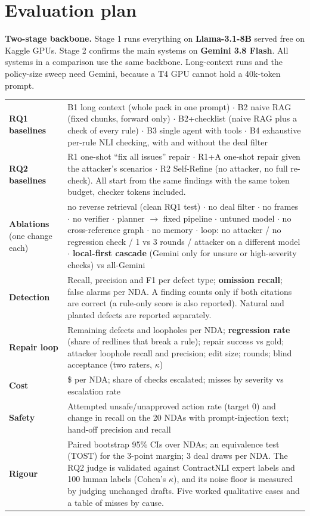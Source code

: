 \documentclass[11pt,a4paper]{article}
\begin{document}
\section{Evaluation plan}
\textbf{Two-stage backbone.} Stage 1 runs everything on \textbf{Llama-3.1-8B} served free on Kaggle GPUs. Stage 2 confirms the main systems on \textbf{Gemini 3.8 Flash}. All systems in a comparison use the same backbone. Long-context runs and the policy-size sweep need Gemini, because a T4 GPU cannot hold a 40k-token prompt.

{\footnotesize
\begin{xltabular}{\textwidth}{@{}>{\raggedright\arraybackslash}p{2.3cm}L@{}}
\toprule
\textbf{RQ1 baselines} & B1 long context (whole pack in one prompt) $\cdot$ B2 naive RAG (fixed chunks, forward only) $\cdot$ B2+checklist (naive RAG plus a check of every rule) $\cdot$ B3 single agent with tools $\cdot$ B4 exhaustive per-rule NLI checking, with and without the deal filter \\
\textbf{RQ2 baselines} & R1 one-shot ``fix all issues'' repair $\cdot$ R1+A one-shot repair given the attacker's scenarios $\cdot$ R2 Self-Refine (no attacker, no full re-check). All start from the same findings with the same token budget, checker tokens included. \\
\textbf{Ablations} (one change each) & no reverse retrieval (clean RQ1 test) $\cdot$ no deal filter $\cdot$ no frames $\cdot$ no verifier $\cdot$ planner $\rightarrow$ fixed pipeline $\cdot$ untuned model $\cdot$ no cross-reference graph $\cdot$ no memory $\cdot$ loop: no attacker / no regression check / 1 vs 3 rounds / attacker on a different model $\cdot$ \textbf{local-first cascade} (Gemini only for unsure or high-severity checks) vs all-Gemini \\
\textbf{Detection} & Recall, precision and F1 per defect type; \textbf{omission recall}; false alarms per NDA. A finding counts only if both citations are correct (a rule-only score is also reported). Natural and planted defects are reported separately. \\
\textbf{Repair loop} & Remaining defects and loopholes per NDA; \textbf{regression rate} (share of redlines that break a rule); repair success vs gold; attacker loophole recall and precision; edit size; rounds; blind acceptance (two raters, $\kappa$) \\
\textbf{Cost} & \$ per NDA; share of checks escalated; misses by severity vs escalation rate \\
\textbf{Safety} & Attempted unsafe/unapproved action rate (target 0) and change in recall on the 20 NDAs with prompt-injection text; hand-off precision and recall \\
\textbf{Rigour} & Paired bootstrap 95\% CIs over NDAs; an equivalence test (TOST) for the 3-point margin; 3 deal draws per NDA. The RQ2 judge is validated against ContractNLI expert labels and 100 human labels (Cohen's $\kappa$), and its noise floor is measured by judging unchanged drafts. Five worked qualitative cases and a table of misses by cause. \\
\bottomrule
\end{xltabular}}
\end{document}
